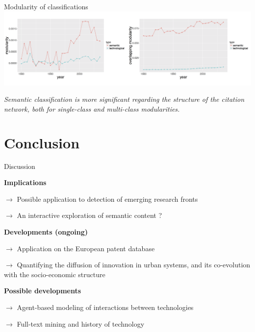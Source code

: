 \documentclass{beamer}
\begin{document}
\begin{frame}{Modularity of classifications}
   \centering
    \includegraphics[width=\textwidth]{figures/Fig9.png}
    
    \medskip
    
    \textit{Semantic classification is more significant regarding the structure of the citation network, both for single-class and multi-class modularities.}
    
\end{frame}

    
    


\section{Conclusion}

\begin{frame}{Discussion}
    \justify

    \textbf{Implications}
     
     \smallskip

    $\rightarrow$ Possible application to detection of emerging research fronts

    \smallskip
    
    $\rightarrow$ An interactive exploration of semantic content ?

    \textbf{Developments (ongoing)}
     
      \smallskip
     
     $\rightarrow$ Application on the European patent database
     
     \smallskip
     
     $\rightarrow$ Quantifying the diffusion of innovation in urban systems, and its co-evolution with the socio-economic structure
     
     \smallskip
     
     \textbf{Possible developments}
     
      \smallskip
     
     $\rightarrow$ Agent-based modeling of interactions between technologies
     
     \smallskip
     
     $\rightarrow$ Full-text mining and history of technology
     
    


\end{frame}
\end{document}
